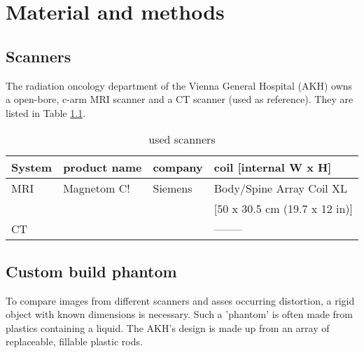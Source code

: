 

\chapter{Material and methods}


\section{Scanners}

The radiation oncology department of the Vienna General Hospital (AKH) owns a open-bore, c-arm MRI scanner and a CT scanner (used as reference).
They are listed in Table \ref{tab:scanners}.

\begin{table}[h]
\centering
\begin{tabular}{llll}
System	& product name	& company	& coil [internal W x H]		\\
\toprule
MRI	& Magnetom C!	& Siemens	& Body/Spine Array Coil XL	\\
	&		&		& [50 x 30.5 cm (19.7 x 12 in)]	\\
CT	&		&		& --------
\end{tabular}
\caption{used scanners}
\label{tab:scanners}
\end{table}

\section{Custom build phantom}

To compare images from different scanners and asses occurring distortion, a rigid object with known dimensions is necessary.
Such a 'phantom' is often made from plastics containing a liquid.
The AKH's design is made up from an array of replaceable, fillable plastic rods.


